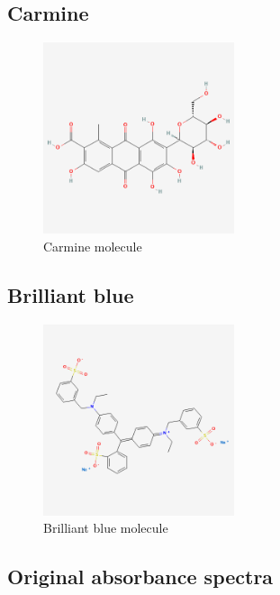 \documentclass{article}
\begin{document}
\subsection{Carmine}

\begin{figure}[!ht]
    \centering
    \includegraphics[width=0.5\textwidth]{Molecules/Carmine_500.png}
    \caption{Carmine molecule}
    \label{fig:carmine}
\end{figure}
\FloatBarrier

\subsection{Brilliant blue}

\begin{figure}[!ht]
    \centering
    \includegraphics[width=0.5\textwidth]{Molecules/Brilliant_Blue_FCF_500.png}
    \caption{Brilliant blue molecule}
    \label{fig:brilliantBlue}
\end{figure}
\FloatBarrier

\subsection{Original absorbance spectra}
\end{document}

